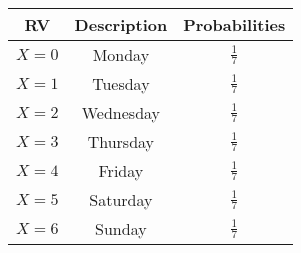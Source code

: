 
\begin{center}
\begin{tabular}{|c|c|c|}
\hline
\textbf{RV} & \textbf{Description} & \textbf{Probabilities}\\ \hline
$X = 0$	    &   Monday & $\frac{1}{7}$\\ \hline
$X = 1$	    &   Tuesday & $\frac{1}{7}$\\ \hline
$X = 2$	    &   Wednesday & $\frac{1}{7}$\\ \hline
$X = 3$	    &   Thursday & $\frac{1}{7}$\\ \hline
$X = 4$	    &   Friday & $\frac{1}{7}$\\ \hline
$X = 5$	    &   Saturday & $\frac{1}{7}$\\ \hline
$X = 6$	    &   Sunday & $\frac{1}{7}$\\ \hline
\end{tabular}
\end{center}
